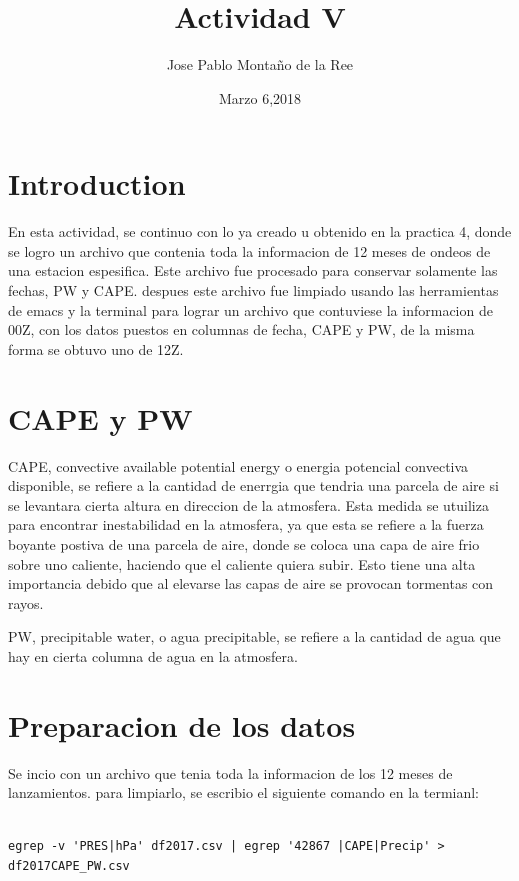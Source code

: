 \documentclass[a4paper]{article}
\title{Actividad V}
\author{Jose Pablo Montaño de la Ree}
\date{Marzo 6,2018}
\begin{document}
\maketitle


\section{Introduction}

En esta actividad, se continuo con lo ya creado u obtenido en la practica 4, donde se logro un archivo que contenia toda la informacion de 12 meses de ondeos de una estacion espesifica. Este archivo fue procesado para conservar solamente las fechas, PW y CAPE. despues este archivo fue limpiado usando las herramientas de emacs y la terminal para lograr un archivo que contuviese la informacion de 00Z, con los datos puestos en columnas de fecha, CAPE y PW, de la misma forma se obtuvo uno de 12Z.

\section{CAPE y PW}

CAPE, convective available potential energy o energia potencial convectiva disponible, se refiere a la cantidad de enerrgia que tendria una parcela de aire si se levantara cierta altura en direccion de la atmosfera. Esta medida se utuiliza para encontrar inestabilidad en la atmosfera, ya que esta se refiere a la fuerza boyante postiva de una parcela de aire, donde se coloca una capa de aire frio sobre uno caliente, haciendo que el caliente quiera subir. Esto tiene una alta importancia debido que  al elevarse las capas de aire se provocan tormentas con rayos. 
\linebreak

PW, precipitable water, o agua precipitable, se refiere a la cantidad de agua que hay en cierta columna de agua en la atmosfera. 

\section{Preparacion de los datos}

Se incio con un archivo que tenia toda la informacion de los 12 meses de lanzamientos. para limpiarlo, se escribio el siguiente comando en la termianl:

\begin{verbatim}

egrep -v 'PRES|hPa' df2017.csv | egrep '42867 |CAPE|Precip' > df2017CAPE_PW.csv

\end{verbatim}
\end{document}
